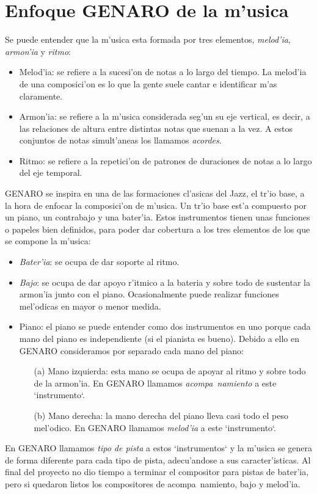 \section{Enfoque GENARO de la m'usica}
Se puede entender que la m'usica esta formada por tres elementos, \emph{melod'ia}, \emph{armon'ia} y \emph{ritmo}:
\begin{itemize}
\item Melod'ia: se refiere a la sucesi'on de notas a lo largo del tiempo. La melod'ia de una composici'on es lo que la gente suele cantar e identificar m'as claramente.
\item Armon'ia: se refiere a la m'usica considerada seg'un su eje vertical, es decir, a las relaciones de altura entre distintas notas que suenan a la vez. A estos conjuntos de notas simult'aneas los llamamos \emph{acordes}.
\item Ritmo: se refiere a la repetici'on de patrones de duraciones de notas a lo largo del eje temporal.
\end{itemize}

GENARO se inspira en una de las formaciones cl'asicas del Jazz, el tr'io base, a la hora de enfocar la composici'on de m'usica. Un tr'io base est'a compuesto por un piano, un contrabajo y una bater'ia. Estos instrumentos tienen unas funciones o papeles bien definidos, para poder dar cobertura a los tres elementos de los que se compone la m'usica:
\begin{itemize}
\item \emph{Bater'ia}: se ocupa de dar soporte al ritmo.
\item \emph{Bajo}: se ocupa de dar apoyo r'itmico a la bateria y sobre todo de sustentar la armon'ia junto con el piano. Ocasionalmente puede realizar funciones mel'odicas en mayor o menor medida.
\item Piano: el piano se puede entender como dos instrumentos en uno porque cada mano del piano es independiente (si el pianista es bueno). Debido a ello en GENARO consideramos por separado cada mano del piano:
        \begin{enumerate}
        \item[(a)] Mano izquierda: esta mano se ocupa de apoyar al ritmo y sobre todo de la armon'ia. En GENARO llamamos \emph{acompa~namiento} a este `instrumento`.
        \item[(b)] Mano derecha: la mano derecha del piano lleva casi todo el peso mel'odico. En GENARO llamamos \emph{melod'ia} a este `instrumento`.
        \end{enumerate}
\end{itemize}

En GENARO llamamos \emph{tipo de pista} a estos `instrumentos` y la m'usica se genera de forma diferente para cada tipo de pista, adecu'andose a sus caracter'isticas. Al final del proyecto no dio tiempo a terminar el compositor para pistas de bater'ia, pero si quedaron listos los compositores de acompa~namiento, bajo y melod'ia.
